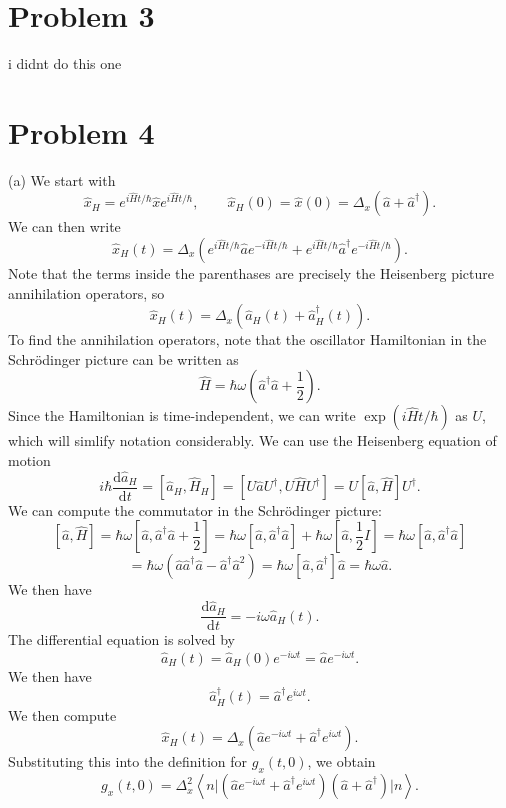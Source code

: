\documentclass[11pt, letterpaper]{article}
\begin{document}
\section{Problem 3}

i didnt do this one

\section{Problem 4}

(a) We start with
\[
	\hat{x} _H = e^{i \hat{H} t/\hbar} \hat{x} e^{i \hat{H} t/\hbar} ,\qquad \hat{x} _H(0)=\hat{x} (0) = \Delta _x(\hat{a} +\hat{a} ^\dagger)
.\]
We can then write
\[
	\hat{x} _H(t) = \Delta _x\left(e^{i \hat{H} t/\hbar} \hat{a} e^{-i \hat{H} t/\hbar} +e^{i \hat{H} t/\hbar} \hat{a}^\dagger e^{-i \hat{H} t/\hbar} \right)
.\]
Note that the terms inside the parenthases are precisely the Heisenberg picture annihilation operators, so
\[
	\hat{x} _H(t) =\Delta_x\left( \hat{a} _H(t) + \hat{a} _H^\dagger(t)\right)
.\]
To find the annihilation operators, note that the oscillator Hamiltonian in the Schr\"odinger picture can be written as
\[
	\hat{H} =\hbar\omega \left( \hat{a} ^\dagger \hat{a} +\frac{1}{2}  \right) 
.\]
Since the Hamiltonian is time-independent, we can write $\exp \left( i \hat{H} t/\hbar \right) $ as $U$, which will simlify notation considerably. We can use the Heisenberg equation of motion
\[
	i\hbar \frac{\mathrm{d}\hat{a} _H}{\mathrm{d}t} =[\hat{a} _H, \hat{H} _H]=[U \hat{a} U^\dagger, U \hat{H} U^\dagger] = U[\hat{a} , \hat{H} ]U^\dagger
.\]
We can compute the commutator in the Schr\"odinger picture:
\[
	[\hat{a} , \hat{H} ]=\hbar \omega \left[ \hat{a} , \hat{a} ^\dagger \hat{a} + \frac{1}{2}  \right] =\hbar\omega \left[ \hat{a} , \hat{a} ^\dagger \hat{a}  \right] + \hbar\omega \left[ \hat{a} , \frac{1}{2} I \right] =\hbar \omega \left[ \hat{a} ,\hat{a} ^\dagger \hat{a}  \right] 
\]
\[
	=\hbar\omega \left( \hat{a} \hat{a} ^\dagger \hat{a} - \hat{a} ^\dagger\hat{a} ^2 \right) =\hbar\omega \left[\hat{a}, \hat{a} ^\dagger \right]\hat{a} =\hbar\omega \hat{a} 
.\]
We then have
\[
	\frac{\mathrm{d}\hat{a} _H}{\mathrm{d}t} =-i\omega \hat{a}_H(t)
.\]
The differential equation is solved by
\[
	\hat{a} _H(t) = \hat{a} _H(0)e^{-i\omega t} =\hat{a} e^{-i\omega t} 
.\]
We then have
\[
	\hat{a} _H^\dagger (t) = \hat{a} ^\dagger e^{i\omega t} 
.\]
We then compute
\[
	\hat{x} _H(t) = \Delta _x\left(\hat{a} e^{-i\omega t} + \hat{a} ^\dagger e^{i\omega t} \right)
.\]
Substituting this into the definition for $g_x(t,0)$, we obtain
\[
	g_x(t,0)=\Delta _x^2\left\langle n\bigg| \left( \hat{a} e^{-i\omega t} + \hat{a} ^\dagger e^{i\omega t}  \right) \left( \hat{a} + \hat{a} ^\dagger \right) \bigg|n\right\rangle
.\]
\end{document}
